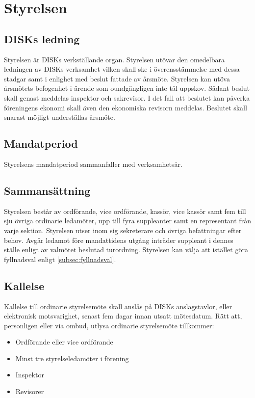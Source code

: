 \clearpage
\section{Styrelsen}
\label{sec:styrelsen}

	\subsection{DISKs ledning}
	\label{subsec:disksledning}
		Styrelsen är DISKs verkställande organ. Styrelsen utövar den omedelbara ledningen av DISKs verksamhet vilken skall ske i överensstämmelse med dessa stadgar samt i enlighet med beslut fattade av årsmöte. Styrelsen kan utöva årsmötets befogenhet i ärende som oundgängligen inte tål uppskov. Sådant beslut skall genast meddelas inspektor och sakrevisor. I det fall att beslutet kan påverka föreningens ekonomi skall även den ekonomiska revisorn meddelas. Beslutet skall snarast möjligt underställas årsmöte.

	\subsection{Mandatperiod}
	\label{subsec:mandatperiod}
		Styrelsens mandatperiod sammanfaller med verksamhetsår.

	\subsection{Sammansättning}
	\label{subsec:sammansattning}
		Styrelsen består av ordförande, vice ordförande, kassör, vice kassör samt fem till sju övriga ordinarie ledamöter, upp till fyra suppleanter samt en representant från varje sektion. Styrelsen utser inom sig sekreterare och övriga befattningar efter behov. Avgår ledamot före mandattidens utgång inträder suppleant i dennes ställe enligt av valmötet beslutad turordning. Styrelsen kan välja att istället göra fyllnadsval enligt \ref{subsec:fyllnadsval}.

	\subsection{Kallelse}
	\label{subsec:kallelse}
		Kallelse till ordinarie styrelsemöte skall anslås på DISKs anslagstavlor, eller elektronisk motsvarighet, senast fem dagar innan utsatt mötesdatum. Rätt att, personligen eller via ombud, utlysa ordinarie styrelsemöte tillkommer:
		\begin{itemize}
		\setlength{\itemsep}{0.0cm}
		\setlength{\parskip}{0.0cm}
			\item Ordförande eller vice ordförande
			\item Minst tre styrelseledamöter i förening
			\item Inspektor
			\item Revisorer
		\end{itemize}

